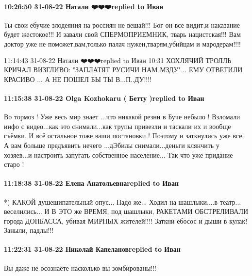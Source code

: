  
 
 
 
 

\paragraph{10:26:50 31-08-22 Натали ❤️❤️❤️replied to Иван}

Ты свои ебучие злодеяния на россиян не вешай!!! Бог он все видит,и наказание
будет жестокое!!! И завали свой СПЕРМОПРИЕМНИК, тварь нацистская!!! Вам доктор
уже не поможет,вам,только палач нужен,тварям,убийцам и мародерам!!!!

11:14:43 31-08-22 Натали ❤️❤️❤️replied to Иван
10:31
ХОХЛЯЧИЙ ТРОЛЛЬ КРИЧАЛ ВИЗГЛИВО:
"ЗАПЛАТЯТ РУСИЧИ НАМ МЗДУ"...
ЕМУ ОТВЕТИЛИ КРАСИВО ...
А НЕ ПОШЕЛ БЫ ТЫ В...П..ДУ!!!!

\paragraph{11:15:38 31-08-22 Olga Kozhokaru ( Бетту )replied to Иван}

Во тормоз ! Уже весь мир знает
...что никакой резни в Буче небыло ! Взломали инфо с видео...как это снимали...как трупы привезли и таскали их и вообще съёмки. И всё остальное тоже ваши постановки ! Поэтому и заткнулись уже все. А вам больше предъявить нечего ...дЭбилы снимали...деньги клянчить у хозяев...и настроить запугать собственное население... Так что уже придание старо !


\paragraph{11:18:38 31-08-22 Елена Анатольевнаreplied to Иван}
*)
КАКОЙ душещипательный опус...
Надо же...
Ходил на шашлыки,...в театр... веселились...
И В ЭТО же ВРЕМЯ, под шашлыки, РАКЕТАМИ ОБСТРЕЛИВАЛИ города ДОНБАССА, убивая МИРНЫХ жителей!!!!
Заткни ебосос и дыши в кулак!
Заныли, падлы!!!

\paragraph{11:22:31 31-08-22 Николай Капелановreplied to Иван}
Вы даже не осознаёте насколько вы зомбированы!!!

